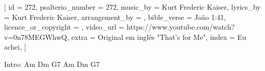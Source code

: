 
[
    id                     = {272},
    psalterio_number       = {272},
    music_by               = {Kurt Frederic Kaiser},
    lyrics_by              = {Kurt Frederic Kaiser},
    arrangement_by         = {},
    bible_verse            = {João 1:41},
    licence_or_copyright   = {},
    video_url              = {https://www.youtube.com/watch?v=0n78MEGWhwQ},
    extra                  = {Original em inglês "That's for Me"},
    index 		             = {Eu achei},
]


\beginverse

Intro: 
Am Dm G7
Am Dm G7

\endverse


\beginverse

